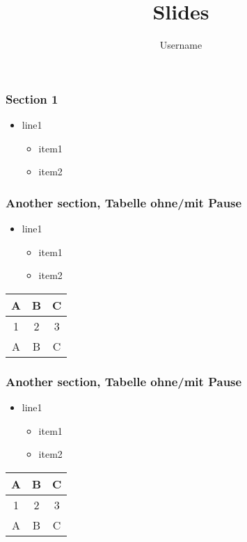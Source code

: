 \documentclass[14pt,t]{beamer}
\title{Slides}
\author{Username}
\begin{document}
\maketitle

\begin{frame}
\frametitle{Section 1}
\begin{itemize}
\item line1
\begin{itemize}
\item item1
\item item2
\end{itemize}
\end{itemize}
\end{frame}



\begin{frame}
\frametitle{Another section, Tabelle ohne/mit Pause}
\begin{itemize}
\item line1
\begin{itemize}
\item item1    
\item item2
\end{itemize}
\end{itemize}
\smallskip
\begin{center}
\begin{tabular}{c c c}
\hline
A & B & C   \\ 
\hline
\hline
1 & 2 & 3 \\  
\hline
A & B & C \\ 
\hline
\end{tabular} 
\end{center}
\end{frame}
 



\begin{frame}
\frametitle{Another section, Tabelle ohne/mit Pause}
\begin{itemize}
\item line1
\begin{itemize}
\item item1  \footnotemark 
\item item2
\end{itemize}
\end{itemize}
\smallskip
\begin{center}
\begin{tabular}{c c c}
\hline
A & B & C   \\ 
\hline
\hline
1 & 2 & 3 \\  
\hline
A & B & C \\ 
\hline
\end{tabular} 
\end{center}
\end{frame}
 
\end{document}
